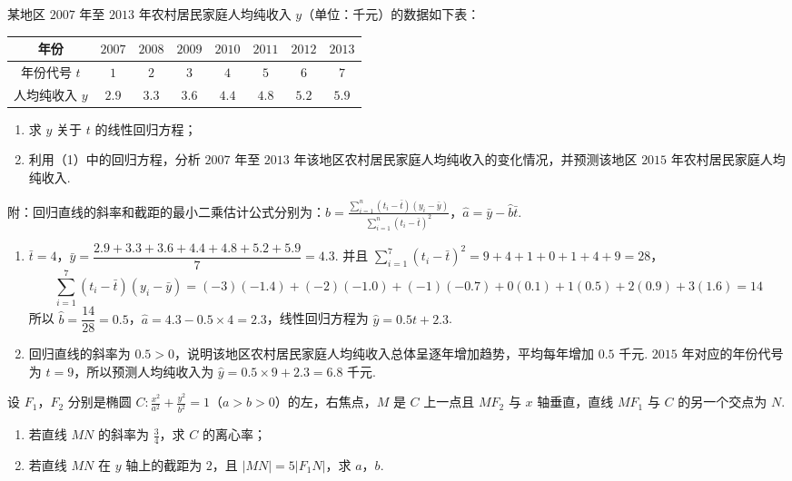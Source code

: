 \begin{problem}
某地区 \(2007\) 年至 \(2013\) 年农村居民家庭人均纯收入 \(y\)（单位：千元）的数据如下表：

\begin{center}
\renewcommand{\arraystretch}{1.2}
\begin{tabular}{c|ccccccc}
\hline
年份 & \(2007\) & \(2008\) & \(2009\) & \(2010\) & \(2011\) & \(2012\) & \(2013\) \\
\hline
年份代号 \(t\) & \(1\) & \(2\) & \(3\) & \(4\) & \(5\) & \(6\) & \(7\) \\
\hline
人均纯收入 \(y\) & \(2.9\) & \(3.3\) & \(3.6\) & \(4.4\) & \(4.8\) & \(5.2\) & \(5.9\) \\
\hline
\end{tabular}
\end{center}

\begin{enumerate}
\item 求 \(y\) 关于 \(t\) 的线性回归方程；
\item 利用（1）中的回归方程，分析 \(2007\) 年至 \(2013\) 年该地区农村居民家庭人均纯收入的变化情况，并预测该地区 \(2015\) 年农村居民家庭人均纯收入.
\end{enumerate}

附：回归直线的斜率和截距的最小二乘估计公式分别为：\(\hat b=\frac{\sum_{i=1}^{n}\left(t_i-\bar t\right)\left(y_i-\bar y\right)}{\sum_{i=1}^{n}\left(t_i-\bar t\right)^2}\)，\(\hat a=\bar y-\hat b\bar t\).
\end{problem}

\begin{solution}
\begin{enumerate}
\item \(\bar t=4\)，\(\bar y=\dfrac{2.9+3.3+3.6+4.4+4.8+5.2+5.9}{7}=4.3\). 并且
\(\sum_{i=1}^{7}(t_i-\bar t)^2=9+4+1+0+1+4+9=28\)，
\[
\sum_{i=1}^{7}(t_i-\bar t)(y_i-\bar y)=(-3)(-1.4)+(-2)(-1.0)+(-1)(-0.7)+0(0.1)+1(0.5)+2(0.9)+3(1.6)=14
\]
所以 \(\hat b=\dfrac{14}{28}=0.5\)，\(\hat a=4.3-0.5\times4=2.3\)，线性回归方程为 \(\hat y=0.5t+2.3\).

\item 回归直线的斜率为 \(0.5>0\)，说明该地区农村居民家庭人均纯收入总体呈逐年增加趋势，平均每年增加 \(0.5\) 千元. \(2015\) 年对应的年份代号为 \(t=9\)，所以预测人均纯收入为 \(\hat y=0.5\times9+2.3=6.8\) 千元.
\end{enumerate}
\end{solution}

\begin{problem}
设 \(F_1\)，\(F_2\) 分别是椭圆 \(C:\frac{x^2}{a^2}+\frac{y^2}{b^2}=1\)（\(a>b>0\)）的左，右焦点，\(M\) 是 \(C\) 上一点且 \(MF_2\) 与 \(x\) 轴垂直，直线 \(MF_1\) 与 \(C\) 的另一个交点为 \(N\).
\begin{enumerate}
\item 若直线 \(MN\) 的斜率为 \(\frac{3}{4}\)，求 \(C\) 的离心率；
\item 若直线 \(MN\) 在 \(y\) 轴上的截距为 \(2\)，且 \(|MN|=5\left|F_1N\right|\)，求 \(a\)，\(b\).
\end{enumerate}
\end{problem}

